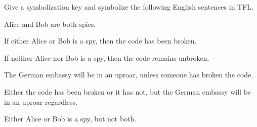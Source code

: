 \problempart
\label{pr.spies}
Give a symbolization key and symbolize the following English sentences in TFL.
\begin{compactlist}
\item Alice and Bob are both spies.
\item[] 
\item If either Alice or Bob is a spy, then the code has been broken.
\item[] 
\item If neither Alice nor Bob is a spy, then the code remains unbroken.
\item[] 
\item The German embassy will be in an uproar, unless someone has broken the code.
\item[] 
\item Either the code has been broken or it has not, but the German embassy will be in an uproar regardless.
\item[] 
\item Either Alice or Bob is a spy, but not both.
\item[] 
\end{compactlist}


